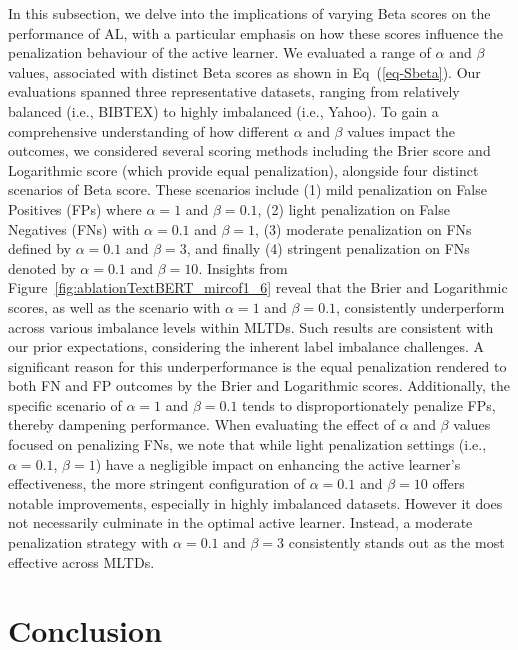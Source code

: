 \documentclass[letterpaper]{article} %
\begin{document}
In this subsection, we delve into the implications of varying Beta scores on the performance of AL, with a particular emphasis on how these scores influence the penalization behaviour of the active learner.
We evaluated a range of $\alpha$ and $\beta$ values, associated with distinct Beta scores as shown in Eq~(\ref{eq-Sbeta}).
Our evaluations spanned three representative datasets, ranging from relatively balanced (i.e., BIBTEX) to highly imbalanced (i.e., Yahoo). To gain a comprehensive understanding of how different $\alpha$ and $\beta$ values impact the outcomes, we considered several scoring methods including the Brier score and Logarithmic score (which provide equal penalization), alongside four distinct scenarios of Beta score. These scenarios include (1) mild penalization on False Positives (FPs) where $\alpha=1$ and $\beta=0.1$, (2) light penalization on False Negatives (FNs) with $\alpha=0.1$ and $\beta=1$, (3) moderate penalization on FNs defined by $\alpha=0.1$ and $\beta=3$, and finally (4) stringent penalization on FNs denoted by $\alpha=0.1$ and $\beta=10$.  Insights from Figure~\ref{fig:ablationTextBERT_mircof1_6} reveal that the Brier and Logarithmic scores, as well as the scenario with $\alpha=1$ and $\beta=0.1$, consistently underperform across various imbalance levels within MLTDs.
Such results are consistent with our prior expectations, considering the inherent label imbalance challenges.
A significant reason for this underperformance is the equal penalization rendered to both FN and FP outcomes by the Brier and Logarithmic scores. Additionally, the specific scenario of $\alpha=1$ and $\beta=0.1$ tends to disproportionately penalize FPs, thereby dampening performance. When evaluating the effect of $\alpha$ and $\beta$ values focused on penalizing FNs, we note that while light penalization settings (i.e., $\alpha=0.1$, $\beta=1$) have a negligible impact on enhancing the active learner's effectiveness, the more stringent configuration of $\alpha=0.1$ and $\beta=10$ offers notable improvements, especially in highly imbalanced datasets. However it does not necessarily culminate in the optimal active learner.
Instead, a moderate penalization strategy with $\alpha=0.1$ and $\beta=3$ consistently stands out as the most effective across MLTDs.







\vspace{-3.02mm}
\section{Conclusion}
\end{document}
